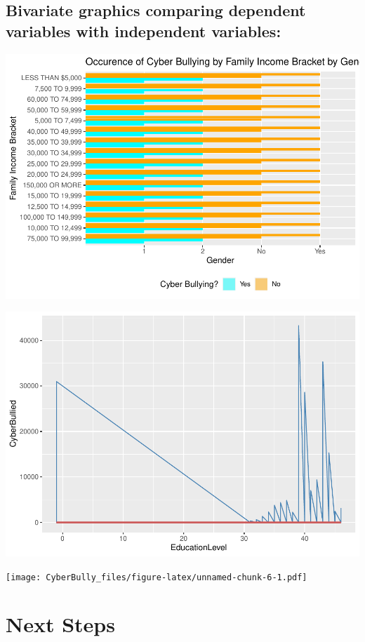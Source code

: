 \documentclass[
  man,LLO-8200, Introduction to Data Science]{apa6}
\begin{document}
\hypertarget{bivariate-graphics-comparing-dependent-variables-with-independent-variables}{%
\subsection{Bivariate graphics comparing dependent variables with independent variables:}\label{bivariate-graphics-comparing-dependent-variables-with-independent-variables}}

\includegraphics{CyberBully_files/figure-latex/unnamed-chunk-4-1.pdf}

\includegraphics{CyberBully_files/figure-latex/unnamed-chunk-5-1.pdf}

\texttt{[image: CyberBully\_files/figure-latex/unnamed-chunk-6-1.pdf]}

\hypertarget{next-steps}{%
\section{Next Steps}\label{next-steps}}
\end{document}
